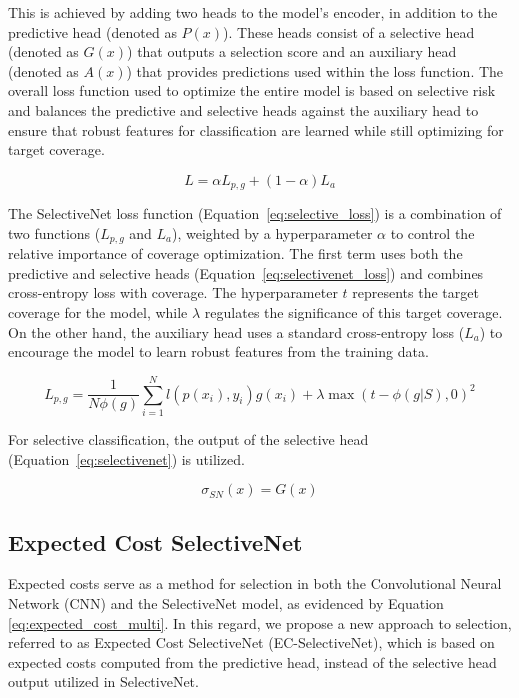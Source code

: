 This is achieved by adding two heads to the model's encoder, in addition to the predictive head (denoted as $P(x)$). These heads consist of a selective head (denoted as $G(x)$) that outputs a selection score and an auxiliary head (denoted as $A(x)$) that provides predictions used within the loss function. The overall loss function used to optimize the entire model is based on selective risk and balances the predictive and selective heads against the auxiliary head to ensure that robust features for classification are learned while still optimizing for target coverage.

\begin{equation}
	L = \alpha L_{p, g} + (1 - \alpha)L_a
	\label{eq:selective_loss}
\end{equation}

The SelectiveNet loss function (Equation~\ref{eq:selective_loss}) is a combination of two functions ($L_{p,g}$ and $L_a$), weighted by a hyperparameter $\alpha$ to control the relative importance of coverage optimization. The first term uses both the predictive and selective heads (Equation~\ref{eq:selectivenet_loss}) and combines cross-entropy loss with coverage. The hyperparameter $t$ represents the target coverage for the model, while $\lambda$ regulates the significance of this target coverage. On the other hand, the auxiliary head uses a standard cross-entropy loss ($L_a$) to encourage the model to learn robust features from the training data. 

\begin{equation}
	L_{p, g} = \frac{1}{N \phi(g)}\sum^{N}_{i=1}l(p(x_i), y_i) g(x_i) + \lambda\max(t - \phi(g|S), 0)^2
	\label{eq:selectivenet_loss}
\end{equation}

\noindent For selective classification, the output of the selective head (Equation~\ref{eq:selectivenet}) is utilized.

\begin{equation}
	\sigma_{SN}(x) = G(x)
	\label{eq:selectivenet}
\end{equation}

\subsection{Expected Cost SelectiveNet}
\label{subsec:ec_selectivenet}
Expected costs serve as a method for selection in both the Convolutional Neural Network (CNN) and the SelectiveNet model, as evidenced by Equation \ref{eq:expected_cost_multi}. In this regard, we propose a new approach to selection, referred to as Expected Cost SelectiveNet (EC-SelectiveNet), which is based on expected costs computed from the predictive head, instead of the selective head output utilized in SelectiveNet.

